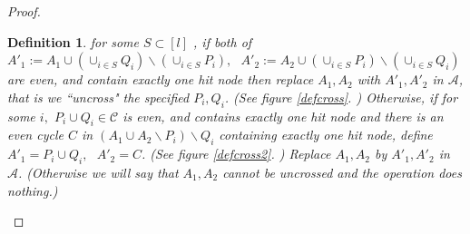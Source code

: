 \documentclass[letterpaper,11pt]{article}
\newtheorem{definition}[theorem]{Definition}
\newcommand{\0}{\mathbb{0}}
\newcommand{\1}{\mathbb{1}}
\begin{document}
\begin{proof}
\begin{definition}
 for some $ S\subset [l] $ , if both of  $ A'_1 := A_1 \cup  (\cup_{i \in S}  Q_i ) \backslash (\cup_{i \in S}  P_i ) ,  \ \ \ A'_2 :=  A_2 \cup  (\cup_{i \in S}  P_i ) \backslash (\cup_{i \in S}  Q_i )  $  are even, and contain exactly one hit node then replace $A_1, A_2$ with $A'_1, A'_2 $  in $\mathcal{A}  $, that is we ``uncross" the specified $P_i, Q_i$. (See figure \ref{defcross}. )  Otherwise, if for some $i,$  $P_i \cup Q_i \in \mathcal{C}  $ is even, and contains exactly one hit node and there is an even cycle $C$ in $ (A_1 \cup A_2 \backslash P_i ) \backslash Q_i $ containing exactly one hit node, define  $ A'_1=P_i \cup Q_i ,   \ \ \ A'_2=C$. (See figure \ref{defcross2}. )   Replace $A_1, A_2 $   by $A'_1, A'_2 $   in  $\mathcal{A} $. (Otherwise we will say that $A_1, A_2$ cannot be uncrossed and the operation does nothing.) 
 

\end{definition}
\end{proof}
\end{document}
